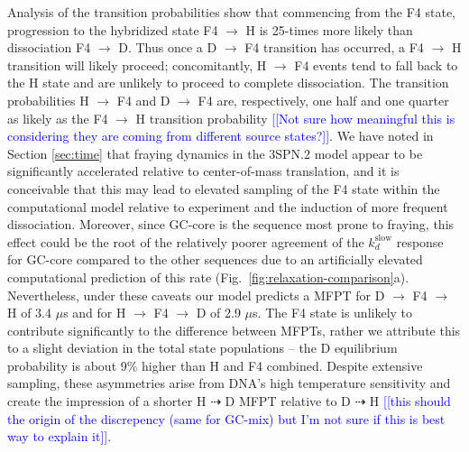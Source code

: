 \documentclass[journal=jpcbfk,manuscript=article]{achemso}
\newcommand*{\noteb}[1]{\textcolor{blue}{[[#1]]}}		%
\begin{document}
Analysis of the transition probabilities show that commencing from the F4 state, progression to the hybridized state F4 $\rightarrow$ H is 25-times more likely than dissociation F4 $\rightarrow$ D. Thus once a D $\rightarrow$ F4 transition has occurred, a F4 $\rightarrow$ H transition will likely proceed; concomitantly, H $\rightarrow$ F4 events tend to fall back to the H state and are unlikely to proceed to complete dissociation. The transition probabilities H $\rightarrow$ F4 and D $\rightarrow$ F4 are, respectively, one half and one quarter as likely as the F4 $\rightarrow$ H transition probability \noteb{Not sure how meaningful this is considering they are coming from different source states?}. We have noted in Section \ref{sec:time} that fraying dynamics in the 3SPN.2 model appear to be significantly accelerated relative to center-of-mass translation, and it is conceivable that this may lead to elevated sampling of the F4 state within the computational model relative to experiment and the induction of more frequent dissociation. Moreover, since GC-core is the sequence most prone to fraying, this effect could be the root of the relatively poorer agreement of the $k_d^\mathrm{slow}$ response for GC-core compared to the other sequences due to an artificially elevated computational prediction of this rate (Fig.~\ref{fig:relaxation-comparison}a). Nevertheless, under these caveats our model predicts a MFPT for D $\rightarrow$ F4 $\rightarrow$ H of 3.4 $\mu$s and for H $\rightarrow$ F4 $\rightarrow$ D of 2.9 $\mu$s. The F4 state is unlikely to contribute significantly to the difference between MFPTs, rather we attribute this to a slight deviation in the total state populations -- the D equilibrium probability is about 9\% higher than H and F4 combined. Despite extensive sampling, these asymmetries arise from DNA's high temperature sensitivity and create the impression of a shorter H $\dashrightarrow$ D MFPT relative to D $\dashrightarrow$ H  \noteb{this should the origin of the discrepency (same for GC-mix) but I'm not sure if this is best way to explain it}.
\end{document}

